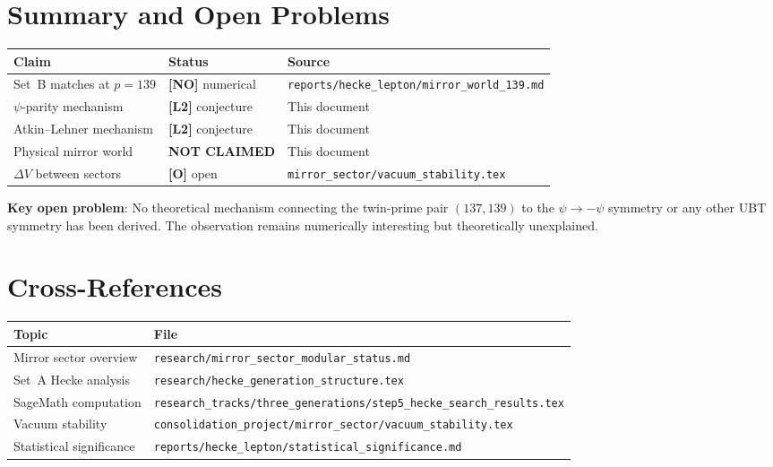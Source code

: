 \documentclass[11pt,a4paper]{article}
\begin{document}
\section{Summary and Open Problems}
\label{sec:open}

\begin{center}
\begin{tabular}{lll}
\hline
Claim & Status & Source \\
\hline
Set~B matches at $p=139$ & \textbf{[NO]} numerical & \texttt{reports/hecke\_lepton/mirror\_world\_139.md} \\
$\psi$-parity mechanism & \textbf{[L2]} conjecture & This document \\
Atkin--Lehner mechanism & \textbf{[L2]} conjecture & This document \\
Physical mirror world & \textbf{NOT CLAIMED} & This document \\
$\Delta V$ between sectors & \textbf{[O]} open & \texttt{mirror\_sector/vacuum\_stability.tex} \\
\hline
\end{tabular}
\end{center}

\textbf{Key open problem}: No theoretical mechanism connecting the twin-prime
pair $(137, 139)$ to the $\psi \to -\psi$ symmetry or any other UBT symmetry
has been derived.  The observation remains numerically interesting but
theoretically unexplained.

\section{Cross-References}
\label{sec:xref}

\begin{tabular}{ll}
\hline
Topic & File \\
\hline
Mirror sector overview & \texttt{research/mirror\_sector\_modular\_status.md} \\
Set~A Hecke analysis & \texttt{research/hecke\_generation\_structure.tex} \\
SageMath computation & \texttt{research\_tracks/three\_generations/step5\_hecke\_search\_results.tex} \\
Vacuum stability & \texttt{consolidation\_project/mirror\_sector/vacuum\_stability.tex} \\
Statistical significance & \texttt{reports/hecke\_lepton/statistical\_significance.md} \\
\hline
\end{tabular}
\end{document}
